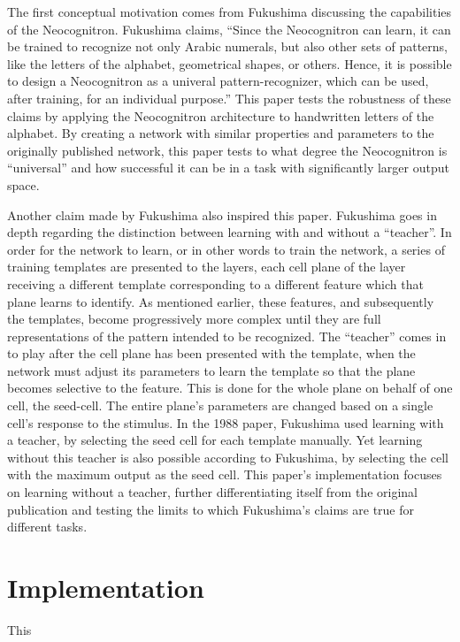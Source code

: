\documentclass[12pt]{article}
\begin{document}
The first conceptual motivation comes from Fukushima discussing the capabilities of the Neocognitron. Fukushima claims, ``Since the Neocognitron can learn, it can be trained to recognize not only Arabic numerals, but also other sets of patterns, like the letters of the alphabet, geometrical shapes, or others. Hence, it is possible to design a Neocognitron as a univeral pattern-recognizer, which can be used, after training, for an individual purpose.'' This paper tests the robustness of these claims by applying the Neocognitron architecture to handwritten letters of the alphabet. By creating a network with similar properties and parameters to the originally published network, this paper tests to what degree the Neocognitron is ``universal'' and how successful it can be in a task with significantly larger output space.

Another claim made by Fukushima also inspired this paper. Fukushima goes in depth regarding the distinction between learning with and without a ``teacher''. In order for the network to learn, or in other words to train the network, a series of training templates are presented to the layers, each cell plane of the layer receiving a different template corresponding to a different feature which that plane learns to identify. As mentioned earlier, these features, and subsequently the templates, become progressively more complex until they are full representations of the pattern intended to be recognized. The ``teacher'' comes in to play after the cell plane has been presented with the template, when the network must adjust its parameters to learn the template so that the plane becomes selective to the feature. This is done for the whole plane on behalf of one cell, the seed-cell. The entire plane's parameters are changed based on a single cell's response to the stimulus. In the 1988 paper, Fukushima used learning with a teacher, by selecting the seed cell for each template manually. Yet learning without this teacher is also possible according to Fukushima, by selecting the cell with the maximum output as the seed cell. This paper's implementation focuses on learning without a teacher, further differentiating itself from the original publication and testing the limits to which Fukushima's claims are true for different tasks. 

\section{Implementation}
This 
\end{document}
